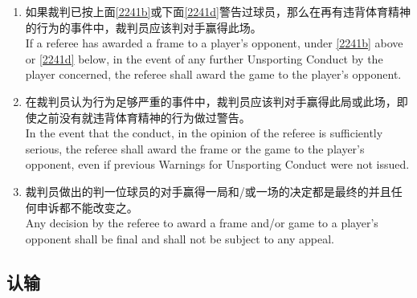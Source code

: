 \begin{enumerate}[label=(\alph*)]
    \item \label{2241c}如果裁判已按上面\ref{2241b}或下面\ref{2241d}警告过球员，那么在再有违背体育精神的行为的事件中，裁判员应该判对手赢得此场。\\
    If a referee has awarded a frame to a player's opponent, under \ref{2241b} above or \ref{2241d} below, in the event of any further Unsporting Conduct by the player concerned, the referee shall award the game to the player's opponent.
    \item \label{2241d}在裁判员认为行为足够严重的事件中，裁判员应该判对手赢得此局或此场，即使之前没有就违背体育精神的行为做过警告。\\
    In the event that the conduct, in the opinion of the referee is sufficiently serious, the referee shall award the frame or the game to the player's opponent, even if previous Warnings for Unsporting Conduct were not issued.
    \item 裁判员做出的判一位球员的对手赢得一局和/或一场的决定都是最终的并且任何申诉都不能改变之。 \\
    Any decision by the referee to award a frame and/or game to a player's opponent shall be final and shall not be subject to any appeal.
\end{enumerate}

\subsection{认输}\label{2242}

